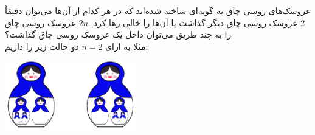 \p
    عروسک‌های روسی چاق به گونه‌ای ساخته شده‌اند که در هر کدام از آن‌ها می‌توان دقیقاً 2 عروسک روسی چاق دیگر گذاشت یا آن‌ها را خالی رها کرد. 
    $2n$
    عروسک روسی چاق را به چند طریق می‌توان داخل یک عروسک روسی چاق گذاشت؟\\
    مثلا به ازای $n=2$ دو حالت زیر را داریم:

    \includegraphics[height=3cm]{q4.png}
